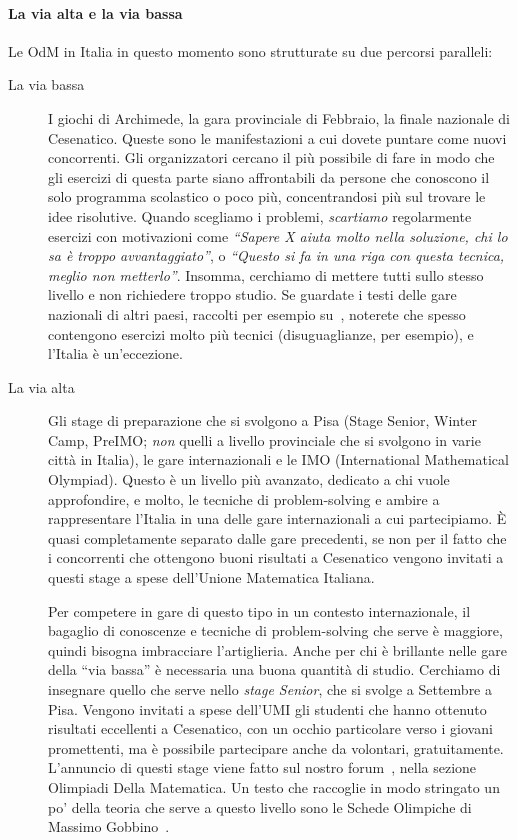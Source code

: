 \documentclass[a4paper,10pt]{paper}
\begin{document}
\paragraph{La via alta e la via bassa}
Le OdM in Italia in questo momento sono strutturate su due percorsi paralleli:
\begin{description}
\item[La via bassa] I giochi di Archimede, la gara provinciale di Febbraio, la finale nazionale di Cesenatico. Queste sono le manifestazioni a cui dovete puntare come nuovi concorrenti. Gli organizzatori cercano il più possibile di fare in modo che gli esercizi di questa parte siano affrontabili da persone che conoscono il solo programma scolastico o poco più, concentrandosi più sul trovare le idee risolutive. Quando scegliamo i problemi, \emph{scartiamo} regolarmente esercizi con motivazioni come \emph{``Sapere X aiuta molto nella soluzione, chi lo sa è troppo avvantaggiato''}, o \emph{``Questo si fa in una riga con questa tecnica, meglio non metterlo''}. Insomma, cerchiamo di mettere tutti sullo stesso livello e non richiedere troppo studio. Se guardate i testi delle gare nazionali di altri paesi, raccolti per esempio su~\cite{mathlinks}, noterete che spesso contengono esercizi molto più tecnici (disuguaglianze, per esempio), e l'Italia è un'eccezione.
 
\item[La via alta] Gli stage di preparazione che si svolgono a Pisa (Stage Senior, Winter Camp, PreIMO; \emph{non} quelli a livello provinciale che si svolgono in varie città in Italia), le gare internazionali e le IMO (International Mathematical Olympiad). Questo è un livello più avanzato, dedicato a chi vuole approfondire, e molto, le tecniche di problem-solving e ambire a rappresentare l'Italia in una delle gare internazionali a cui partecipiamo. È quasi completamente separato dalle gare precedenti, se non per il fatto che i concorrenti che ottengono buoni risultati a Cesenatico vengono invitati a questi stage a spese dell'Unione Matematica Italiana.

Per competere in gare di questo tipo in un contesto internazionale, il bagaglio di conoscenze e tecniche di problem-solving che serve è maggiore, quindi bisogna imbracciare l'artiglieria. Anche per chi è brillante nelle gare della ``via bassa'' è necessaria una buona quantità di studio. Cerchiamo di insegnare quello che serve nello \emph{stage Senior}, che si svolge a Settembre a Pisa. Vengono invitati a spese dell'UMI gli studenti che hanno ottenuto risultati eccellenti a Cesenatico, con un occhio particolare verso i giovani promettenti, ma è possibile partecipare anche da volontari, gratuitamente. L'annuncio di questi stage viene fatto sul nostro forum~\cite{oliforum}, nella sezione Olimpiadi Della Matematica. Un testo che raccoglie in modo stringato un po' della teoria che serve a questo livello sono le Schede Olimpiche di Massimo Gobbino~\cite{schedeolimpiche}. 
\end{description}
\end{document}
